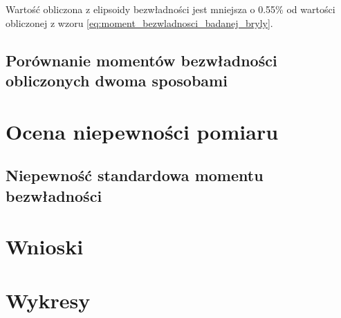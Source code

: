 \documentclass[a4paper,12pt]{article}
\begin{document}
Wartość obliczona z elipsoidy bezwładności jest mniejsza o 0.55\% od wartości obliczonej z wzoru \eqref{eq:moment_bezwladnosci_badanej_bryly}.


\subsection{Porównanie momentów bezwładności obliczonych dwoma sposobami}



\section{Ocena niepewności pomiaru}

\subsection{Niepewność standardowa momentu bezwładności}


\section{Wnioski}


\section{Wykresy}



\end{document}

